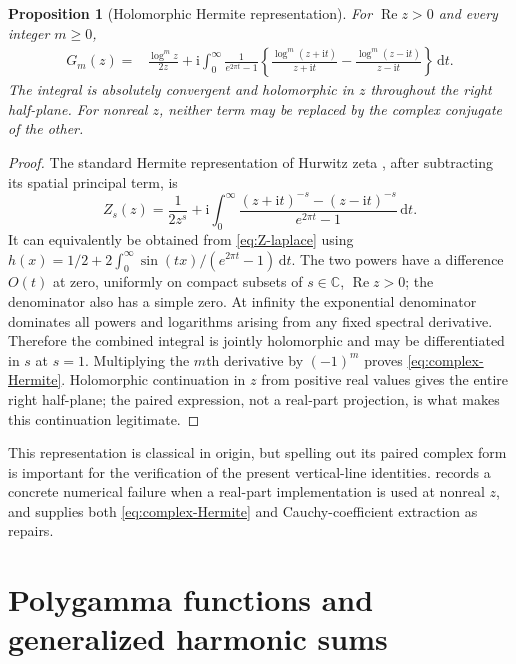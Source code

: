 \documentclass[11pt,a4paper]{article}
\newtheorem{proposition}[theorem]{Proposition}
\theoremstyle{definition}
\numberwithin{equation}{section}
\newcommand{\C}{\mathbb C}
\newcommand{\Rea}{\operatorname{Re}}
\newcommand{\dd}{\,\mathrm d}
\newcommand{\ii}{\mathrm i}
\begin{document}
\begin{proposition}[Holomorphic Hermite representation]\label{thm:complex-Hermite}
For $\Rea z>0$ and every integer $m\ge0$,
\begin{align}
 G_m(z)={}&\frac{\log^m z}{2z}
  +\ii\int_0^\infty\frac1{e^{2\pi t}-1}
       \left\{\frac{\log^m(z+\ii t)}{z+\ii t}
                  -\frac{\log^m(z-\ii t)}{z-\ii t}\right\}\dd t.
                     \label{eq:complex-Hermite}
\end{align}
The integral is absolutely convergent and holomorphic in $z$ throughout
the right half-plane. For nonreal $z$, neither term may be replaced by
the complex conjugate of the other.
\end{proposition}
\begin{proof}
The standard Hermite representation of Hurwitz zeta
\cite{dlmf-zeta}, after subtracting its spatial principal term, is
\[
 Z_s(z)=\frac1{2z^s}
   +\ii\int_0^\infty
        \frac{(z+\ii t)^{-s}-(z-\ii t)^{-s}}{e^{2\pi t}-1}\dd t.
\]
It can equivalently be obtained from \eqref{eq:Z-laplace} using
$h(x)=1/2+2\int_0^\infty\sin(tx)/(e^{2\pi t}-1)\dd t$.
The two powers have a difference $O(t)$ at zero, uniformly on compact
subsets of $s\in\C$, $\Rea z>0$; the denominator also has a simple zero.
At infinity the exponential denominator dominates all powers and
logarithms arising from any fixed spectral derivative. Therefore the
combined integral is jointly holomorphic and may be differentiated in
$s$ at $s=1$. Multiplying the $m$th derivative by $(-1)^m$ proves
\eqref{eq:complex-Hermite}. Holomorphic continuation in $z$ from positive
real values gives the entire right half-plane; the paired expression,
not a real-part projection, is what makes this continuation legitimate.
\end{proof}

This representation is classical in origin, but spelling out its paired
complex form is important for the verification of the present vertical-line
identities.  records a concrete numerical failure
when a real-part implementation is used at nonreal $z$, and supplies both
\eqref{eq:complex-Hermite} and Cauchy-coefficient extraction as repairs.

\section{Polygamma functions and generalized harmonic sums}
\label{sec:harmonics}
\end{document}
